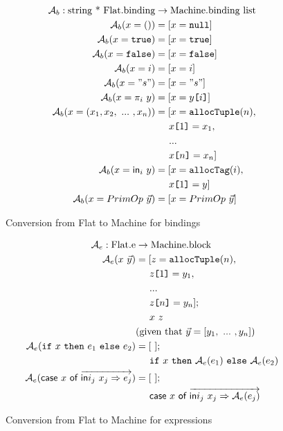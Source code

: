 \documentclass{article}
\theoremstyle{definition}
\theoremstyle{remark}
\numberwithin{equation}{section}
\begin{document}
\begin{figure}[!ht]
  \centering
\begin{align*}
\mathcal{A}_b : \textrm{string * Flat.binding} &\to \textrm{Machine.binding list}\\ %
\mathcal{A}_b(x=()) & = [x=\texttt{null}]\\ %
\mathcal{A}_b(x=\texttt{true}) & = [x=\texttt{true}]\\ %
\mathcal{A}_b(x=\texttt{false}) & = [x=\texttt{false}]\\ %
\mathcal{A}_b(x=i) & = [x=i]\\ %
\mathcal{A}_b(x="s") & = [x="s"]\\ %
\mathcal{A}_b(x=\pi _i\ y) & = [x=y\texttt{[}i\texttt{]}]\\ %
\mathcal{A}_b(x=(x_1,x_2,\ ...\ , x_n)) & = [x=\texttt{allocTuple}(n),\\
    &\kern0.5cm x\texttt{[}1\texttt{]}=x_1,\\
    &\kern0.5cm...\\
    &\kern0.5cm x\texttt{[}n\texttt{]}=x_n]\\ %
\mathcal{A}_b(x=\textsf{in}_i\ y) & = [x=\texttt{allocTag}(i),\\
    &\kern0.5cm x\texttt{[}1\texttt{]}=y]\\ %
\mathcal{A}_b(x=PrimOp\ \vec{y}) & = [x=PrimOp\ \vec{y}] %
\end{align*}
  \caption{Conversion from Flat to Machine for bindings}
  \label{fig-sub}
\end{figure}

\begin{figure}[!ht]
  \centering
\begin{align*}
\mathcal{A}_e : \textrm{Flat.e} &\to \textrm{Machine.block}\\ %
\mathcal{A}_e(x\ \vec{y}) & = [z=\texttt{allocTuple}(n),\\
    & \kern0.5cm z\texttt{[}1\texttt{]}=y_1,\\
    & \kern0.5cm ...\\
    & \kern0.5cm z\texttt{[}n\texttt{]}=y_n];\\
    & \kern0.5cm x\ z \\%
    &(\textrm{given that}\ \vec{y}=[y_1,\ ...\ , y_n])\\
\mathcal{A}_e(\texttt{if}\ x\ \texttt{then}\ e_1\ \texttt{else}\ e_2) & = [\ ];\\
    & \kern0.5cm \texttt{if}\ x\ \texttt{then}\ \mathcal{A}_e(e_1)
        \ \texttt{else}\ \mathcal{A}_e(e_2) \\   %
\mathcal{A}_e(\textsf{case}\ x\ \textsf{of}
         \ \overrightarrow{\textsf{in}i_j\ x_j \Rightarrow e_j})
    & = [\ ];\\
    & \kern0.5cm \textsf{case}\ x\ \textsf{of}
         \ \overrightarrow{\textsf{in}i_j\ x_j \Rightarrow \mathcal{A}_e(e_j)}   %
\end{align*}
  \caption{Conversion from Flat to Machine for expressions}
  \label{fig-sub}
\end{figure}
\end{document}
